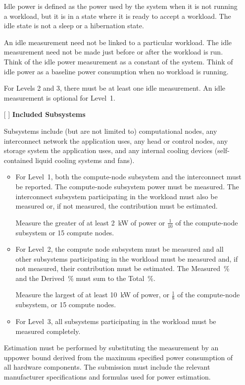 \begin{itemize}
Idle power is defined as the power used by the system when it is not running a workload, but it is in a state where it is ready to accept a workload. The idle state is not a sleep or a hibernation state.

An idle measurement need not be linked to a particular workload. The idle measurement need not be made just before or after the workload is run. Think of the idle power measurement as a constant of the system. Think of idle power as a baseline power consumption when no workload is running. 

For Levels 2 and 3, there must be at least one idle measurement. An idle measurement is optional for Level~1. 

\newpage
\item[{[ ]}]
\textbf{Included Subsystems}

Subsystems include (but are not limited to) computational nodes, any interconnect network the application uses, any head or control nodes, any storage system the application uses, and any internal cooling devices (self-contained liquid cooling systems and fans).  

\begin{itemize}
\item
For Level~1, both the compute-node subsystem and the interconnect must be reported.  
The compute-node subsystem power must be measured. 
The interconnect subsystem participating in the workload must also be measured or, if not measured, the contribution must be estimated.

Measure the greater of at least 2~kW of power or $\frac{1}{10}$ of the compute-node subsystem or 15 compute nodes.

\item
For Level~2, the compute node subsystem must be measured and all other subsystems participating in the workload must be measured and, if not measured, their contribution must be estimated.
The Measured~\% and the Derived~\% must sum to the Total~\%.

Measure the largest of at least 10~kW of power, or $\frac{1}{8}$ of the compute-node subsystem, or 15 compute nodes.

\item
For Level~3, all subsystems participating in the workload must be measured completely.
\end{itemize}

Estimation must be performed by substituting the measurement by an uppower bound derived from the maximum specified power consumption of all hardware components.
The submission must include the relevant manufacturer specifications and formulas used for power estimation. 


\end{itemize}
